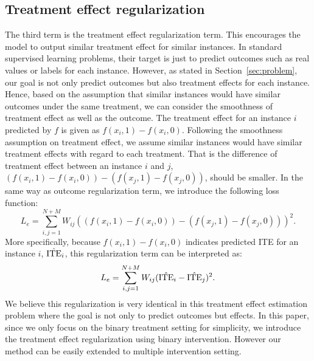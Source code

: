 
\subsection{Treatment effect regularization}
The third term is the treatment effect regularization term. This encourages the model to output similar treatment effect for similar instances. In standard supervised learning problems, their target is just to predict outcomes such as real values or labels for each instance. However, as stated in Section~\ref{sec:problem}, our goal is not only predict outcomes but also treatment effects for each instance. Hence, based on the assumption that similar instances would have similar outcomes under the same treatment, we can consider the smoothness of treatment effect as well as the outcome. The treatment effect for an instance $i$ predicted by $f$ is given as $f(x_i, 1)-f(x_i, 0)$. Following the smoothness assumption on treatment effect, we assume similar instances would have similar treatment effects with regard to each treatment. That is the difference of treatment effect between an instance $i$ and $j$, $(f(x_i, 1)-f(x_i, 0))-(f(x_j, 1)-f(x_j, 0))$, should be smaller.  In the same way as outcome regularization term, we introduce the following loss function:
\begin{equation}\label{eq:treatment}
L_e=\sum_{i,j=1}^{N+M}W_{ij} ((f(x_i, 1)-f(x_i, 0)) - (f(x_j, 1)-f(x_j, 0))) ^{2}.
\end{equation}
\noindent
More specifically, because $f(x_i, 1)-f(x_i, 0)$ indicates predicted ITE for an instance $i$, ${\rm\hat{ITE}}_i$, this regularization term can be interpreted as:
\begin{equation}
\label{eq:treatment}
L_e=\sum_{i,j=1}^{N+M}W_{ij} ({\rm\hat{ ITE}}_i-{\rm \hat{ITE}}_j) ^{2}.
\end{equation}
We believe this regularization is very identical in this treatment effect estimation problem where the goal is not only to predict outcomes but effects.
In this paper, since we only focus on the binary treatment setting for simplicity, we introduce the treatment effect regularization using binary intervention. However our method can be easily extended to multiple intervention setting. 



